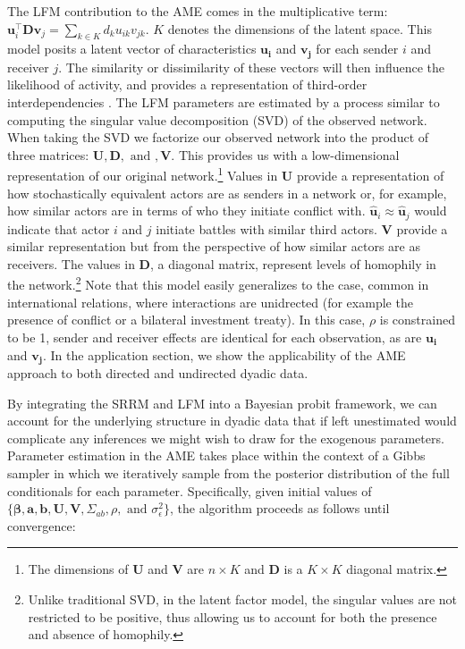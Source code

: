 The LFM contribution to the AME comes in the multiplicative term: $\mathbf{u}_{i}^{\top} \mathbf{D} \mathbf{v}_{j}=\sum_{k \in K} d_{k} u_{ik} v_{jk}$. $K$ denotes the dimensions of the latent space. This model posits a latent vector of characteristics $\mathbf{u_{i}}$ and $\mathbf{v_{j}}$ for each sender $i$ and receiver $j$. The similarity or dissimilarity of these vectors will then influence the likelihood of activity, and provides a representation of third-order interdependencies \citep{minhas:etal:2016:arxiv}. The LFM parameters are estimated by a process similar to computing the singular value decomposition (SVD) of the observed network. When taking the SVD we factorize our observed network into the product of three matrices: $\mathbf{U}, \mathbf{D}, \text{ and }, \mathbf{V}$. This provides us with a low-dimensional representation of our original network.\footnote{The dimensions of $\mathbf{U}$ and $\mathbf{V}$ are $n \times K$ and $\mathbf{D}$ is a $K \times K$ diagonal matrix.} Values in $\mathbf{U}$ provide a representation of how stochastically equivalent actors are as senders in a network or, for example, how similar actors are in terms of who they initiate conflict with. $\hat{\mathbf{u}}_{i} \approx \hat{\mathbf{u}}_{j}$ would indicate that actor $i$ and $j$ initiate battles with similar third actors. $\mathbf{V}$ provide a similar representation but from the perspective of how similar actors are as receivers. The values in $\mathbf{D}$, a diagonal matrix, represent levels of homophily in the network.\footnote{Unlike traditional SVD, in the latent factor model, the singular values are not restricted to be positive, thus allowing us to account for both the presence and absence of homophily.} Note that this model easily generalizes to the case, common in international relations, where interactions are unidrected (for example the presence of conflict or a bilateral investment treaty). In this case, $\rho$ is constrained to be 1, sender and receiver effects are identical for each observation, as are $\mathbf{u_{i}}$ and $\mathbf{v_{j}}$. In the application section, we show the applicability of the AME approach to both directed and undirected dyadic data.

By integrating the SRRM and LFM into a Bayesian probit framework, we can account for the underlying structure in dyadic data that if left unestimated would complicate any inferences we might wish to draw for the exogenous parameters. Parameter estimation in the AME takes place within the context of a Gibbs sampler in which we iteratively sample from the posterior distribution of the full conditionals for each parameter. Specifically, given initial values of $\{\bm\beta, \mathbf{a}, \mathbf{b}, \mathbf{U}, \mathbf{V}, \Sigma_{ab}, \rho, \text{ and } \sigma_{\epsilon}^{2}\}$, the algorithm proceeds as follows until convergence:

